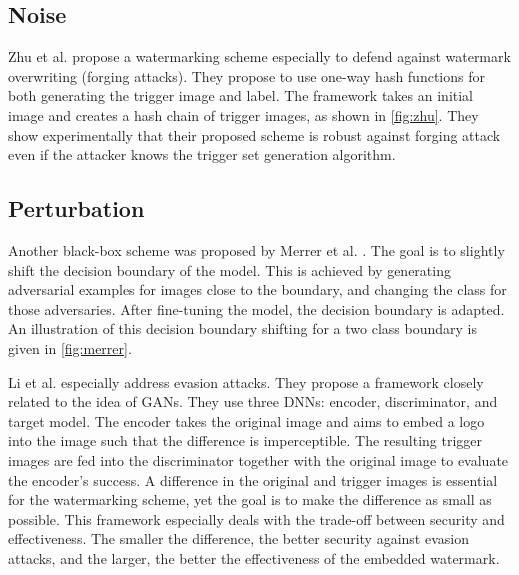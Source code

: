 \subsection{Noise}
Zhu et al. \cite{zhu_secure_2020} propose a watermarking scheme especially to defend against watermark overwriting (forging attacks). They propose to use one-way hash functions for both generating the trigger image and label.
The framework takes an initial image and creates a hash chain of trigger images, as shown in \cref{fig:zhu}. They show experimentally that their proposed scheme is robust against forging attack even if the attacker knows the trigger set generation algorithm.



\subsection{Perturbation}
Another black-box scheme was proposed by Merrer et al. \cite{merrer_adversarial_2019}. The goal is to slightly shift the decision boundary of the model. This is achieved by generating adversarial examples \cite{szegedy_intriguing_2014} for images close to the boundary, and changing the class for those adversaries. %
After fine-tuning the model, the decision boundary is adapted. An illustration of this decision boundary shifting for a two class boundary is given in \cref{fig:merrer}.



Li et al. \cite{li_how_2019} especially address evasion attacks. They propose a framework closely related to the idea of GANs. They use three DNNs: encoder, discriminator, and target model. The encoder takes the original image and aims to embed a logo into the image such that the difference is imperceptible. The resulting trigger images are fed into the discriminator together with the original image to evaluate the encoder's success.
A difference in the original and trigger images is essential for the watermarking scheme, yet the goal is to make the difference as small as possible. This framework especially deals with the trade-off between security and effectiveness. The smaller the difference, the better security against evasion attacks, and the larger, the better the effectiveness of the embedded watermark.

